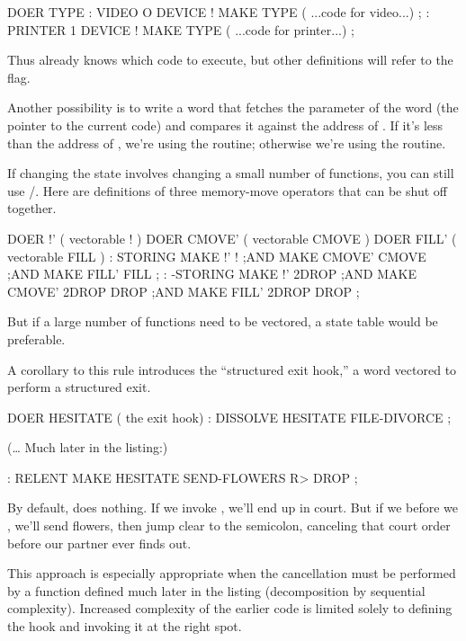 \begin{Code}
DOER TYPE
: VIDEO   O DEVICE !  MAKE TYPE
     ( ...code for video...) ;
: PRINTER   1 DEVICE !  MAKE TYPE
     ( ...code for printer...) ;
\end{Code}
Thus  already knows which code to execute, but other definitions
will refer to the flag.

Another possibility is to write a word that fetches the parameter of the
 word  (the pointer to the current code) and
compares it against the address of . If it's less than the
address of , we're using the  routine;
otherwise we're using the  routine.

If changing the state involves changing a small number of functions,
you can still use /. Here are definitions of three
memory-move operators that can be shut off together.

\begin{Code}
DOER !'  ( vectorable ! )
DOER CMOVE'  ( vectorable CMOVE )
DOER FILL'  ( vectorable FILL )
: STORING   MAKE !' ! ;AND
            MAKE CMOVE'  CMOVE ;AND
            MAKE FILL'  FILL ;
: -STORING  MAKE !'  2DROP ;AND
            MAKE CMOVE'  2DROP DROP ;AND
            MAKE FILL'  2DROP DROP ;
\end{Code}
But if a large number of functions need to be vectored, a state table
would be preferable.

A corollary to this rule introduces the ``structured exit hook,'' a
 word vectored to perform a structured exit.

\begin{Code}
DOER HESITATE  ( the exit hook)
: DISSOLVE   HESITATE  FILE-DIVORCE ;
\end{Code}
(\dots{} Much later in the listing:)
\begin{Code}
: RELENT   MAKE HESITATE   SEND-FLOWERS  R> DROP ;
\end{Code}
By default,  does nothing. If we invoke ,
we'll end up in court. But if we  before we
, we'll send flowers, then jump clear to the semicolon,
canceling that court order before our partner ever finds out.

This approach is especially appropriate when the cancellation must be
performed by a function defined much later in the listing (decomposition
by sequential complexity). Increased complexity of the earlier code is
limited solely to defining the hook and invoking it at the right spot.%

